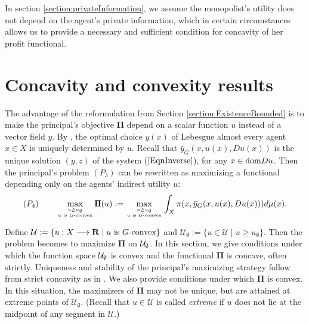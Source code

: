 \medskip


%


In section \ref{section:privateInformation},  we assume the monopolist's utility does not depend on the agent's private information, which in certain circumstances allows us to provide a necessary and sufficient condition for concavity of her profit functional.
\medskip



\medskip


\section{Concavity and convexity results}\label{section:concavity}
The advantage of the reformulation from Section \ref{section:ExistenceBounded} is to make the principal's objective $\pmb \Pi$ 
depend on a scalar function $u$ instead of a vector field $y$.
By \Gone, the optimal choice $y(x)$ of   Lebesgue almost every agent $x\in X$
is uniquely determined by $u$.  Recall that $\bar{y}_G(x, u(x), Du(x))$ is the unique solution $(y,z)$ of the system ($\ref{EqnInverse}$), for any $x\in {\mathop{\rm dom}} Du$. 
Then the principal's problem $(P_3)$ can be rewritten as maximizing a functional 
depending only on the agents' indirect utility $u$:
\begin{equation}\label{eqn:principalFinal}
	(P_4) \ \ \ \ \ \  \max\limits_{ u\ge u_{\emptyset} \atop \text{$u$ is $G$-convex}} \pmb\Pi(u) := \max\limits_{u \ge u_{\emptyset} \atop \text{$u$ is $G$-convex}} \int_X \pi(x, \bar{y}_G(x, u(x), Du(x)))  d \mu(x) .
\end{equation}


Define $\mathcal{U}:=\{u:X\longrightarrow {\mathbf R} \mid  u \text{ is } G\text{-convex}\}$
and $\mathcal{U}_{\emptyset}:=\{u \in \mathcal{U}\mid  u\ge u_{\emptyset}\}$. 
Then the problem becomes to maximize $\pmb\Pi$ on $\mathcal{U}_{\emptyset}$. 
In this section, we give conditions under which the function space $\mathcal{U}_{\emptyset}$ 
is convex and the functional $\pmb\Pi$ is concave, often strictly.
Uniqueness and stability of the principal's maximizing strategy follow from strict concavity as in \cite{FigalliKimMcCann11}. We also provide conditions under which $\pmb\Pi$ is convex. In this situation, the maximizers of $\pmb\Pi$ may not be unique, but are attained at extreme points of 
$\mathcal{U}_{\emptyset}$. (Recall that $u \in \mathcal{U}$ is called {\em extreme} if 
$u$ does not lie at the midpoint of any segment in $\mathcal{U}$.)
\medskip


